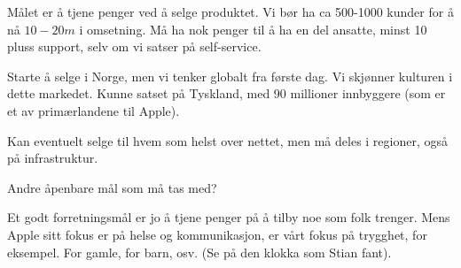 
Målet er å tjene penger ved å selge produktet.
Vi bør ha ca 500-1000 kunder for å nå $10-20m$ i omsetning.
Må ha nok penger til å ha en del ansatte, minst 10 pluss support, selv om vi
satser på self-service.

Starte å selge i Norge, men vi tenker globalt fra første dag.
Vi skjønner kulturen i dette markedet. Kunne satset på Tyskland, med 90
millioner innbyggere (som er et av primærlandene til Apple).

Kan eventuelt selge til hvem som helst over nettet, men må deles i regioner,
også på infrastruktur.

Andre åpenbare mål som må tas med?

Et godt forretningsmål er jo å tjene penger på å tilby noe som folk trenger.
Mens Apple sitt fokus er på helse og kommunikasjon, er vårt fokus på trygghet,
for eksempel. For gamle, for barn, osv. (Se på den klokka som Stian fant).














